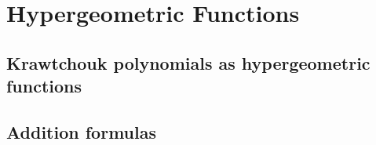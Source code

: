 \chapter{Hypergeometric Functions}
\label{ch:15}
\section{Krawtchouk polynomials as hypergeometric functions}
\label{sec:15-1}

\section{Addition formulas}
\label{sec:15-2}

